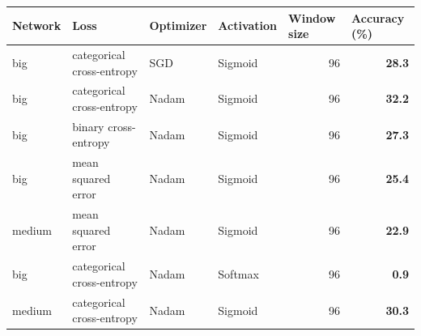 \documentclass[11pt, twocolumn]{article}
\begin{document}
\begin{table}
    \centering
    \begin{tabular}{@{}llllrr@{}}
        \toprule
        \textbf{Network}               & \textbf{Loss}                               & \textbf{Optimizer}            & \textbf{Activation}             & \multicolumn{1}{l}{\textbf{Window size}}                                & \multicolumn{1}{l}{\textbf{Accuracy (\%)}} \\ \midrule
        big                            & categorical cross-entropy                    & SGD                           & Sigmoid                         & \multicolumn{1}{r|}{96}                                                 & \textbf{28.3}                              \\
        big                            & categorical cross-entropy                    & \cellcolor[HTML]{9AFF99}Nadam & Sigmoid                         & \multicolumn{1}{r|}{96}                                                 & \textbf{32.2}                              \\
        big                            & \cellcolor[HTML]{FFCCC9}binary cross-entropy & Nadam                         & Sigmoid                         & \multicolumn{1}{r|}{96}                                                 & \textbf{27.3}                              \\
        big                            & \cellcolor[HTML]{FFCCC9}mean squared error  & Nadam                         & Sigmoid                         & \multicolumn{1}{r|}{96}                                                 & \textbf{25.4}                              \\
        \cellcolor[HTML]{FFCCC9}medium & mean squared error                          & Nadam                         & Sigmoid                         & \multicolumn{1}{r|}{96}                                                 & \textbf{22.9}                              \\
        big                            & categorical cross-entropy                    & Nadam                         & \cellcolor[HTML]{FFCCC9}Softmax & \multicolumn{1}{r|}{96}                                                 & \textbf{0.9}                               \\
        \cellcolor[HTML]{FFCCC9}medium & categorical cross-entropy                    & Nadam                         & Sigmoid                         & \multicolumn{1}{r|}{96}                                                 & \textbf{30.3}                              \\

\end{tabular}
\end{table}
\end{document}
